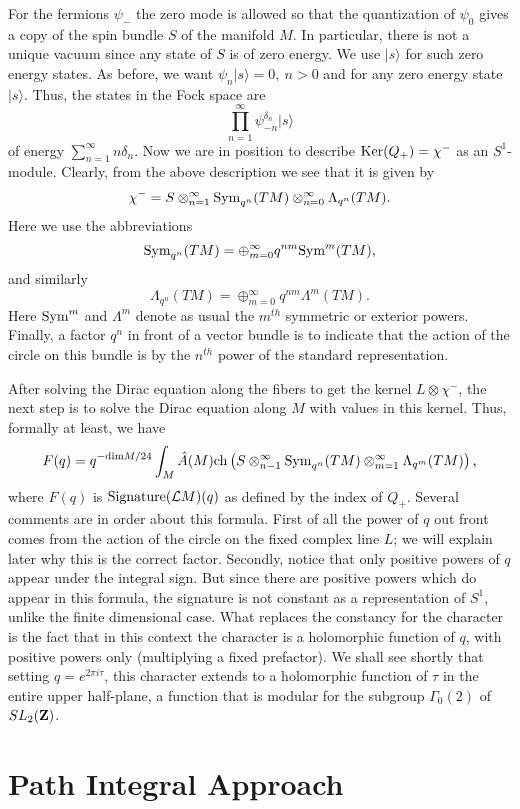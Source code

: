 For the fermions $\psi_-$ the zero mode is allowed so that the
quantization of $\psi_0$ gives a copy of the spin bundle $S$ of the
manifold $M$. In particular, there is not a unique vacuum since any
state of $S$ is of zero energy. We use $|s\rangle$ for such zero
energy states. As before, we want $\psi_n|s\rangle=0,\ n>0$ and for
any zero energy state $|s\rangle$. Thus, the states in the Fock space
are 
$$\prod_{n=1}^\infty\psi_{-n}^{\delta_n}|s\rangle$$
of energy $\sum_{n=1}^\infty n\delta_n$.
Now we are in position to describe ${\rm Ker}(Q_+)=\chi^-$ as an
$S^1$-module. 
Clearly, from the above description we see that it is given by
$$\chi^-=S\otimes_{n=1}^\infty {\rm
Sym}_{q^n}(TM)\otimes_{n=0}^\infty\Lambda_{q^n}(TM).$$
Here we use the abbreviations
$${\rm Sym}_{q^n}(TM)= \oplus_{m=0}^\infty q^{nm}{\rm Sym}^m(TM),$$
and similarly 
$$\Lambda_{q^n}(TM)=\oplus_{m=0}^\infty q^{nm}\Lambda^m(TM).$$
Here ${\rm Sym}^m$ and $\Lambda^m$ denote as usual the $m^{th}$ symmetric
or exterior powers.
  Finally, a factor $q^n$ in front of a vector bundle is to
indicate that the action of the circle on this bundle is by the
$n^{th}$ power of the standard representation.

After solving the Dirac equation along the fibers to get the kernel
$L\otimes \chi^-$, the next step is to solve the Dirac equation
along $M$ with values in this kernel.
Thus, formally at least, we have
$$F(q)=q^{-{\rm dim}M/24}\int_M\hat A(M){\rm
ch}\left(S\otimes _{n-1}^\infty{\rm
Sym}_{q^n}(TM)\otimes_{m=1}^\infty\Lambda_{q^m}(TM)\right),$$
where $F(q)$ is ${\rm Signature}({\cal L}M)(q)$ as defined by the
index of $Q_+$.
Several comments are in order about this formula. First of all the
power of $q$ out front comes from the action of the circle on the fixed
complex line $L$;  we will explain later why this is
the correct factor. Secondly, notice that only positive powers of $q$
appear under the integral sign. But since there are positive powers
which do appear in this 
formula, the signature is not constant as a representation of $S^1$,
unlike the finite dimensional case. What replaces the constancy for
the character is the
fact that in this context the character is a holomorphic function of
$q$, with positive powers only (multiplying a fixed prefactor). We shall see 
shortly that setting $q=e^{2\pi i\tau}$, this character extends to a
holomorphic function of $\tau$ in the entire upper half-plane, a
function that is modular for the subgroup $\Gamma_0(2)$ of $SL_2({\bf Z})$.  


\section{Path Integral Approach}

